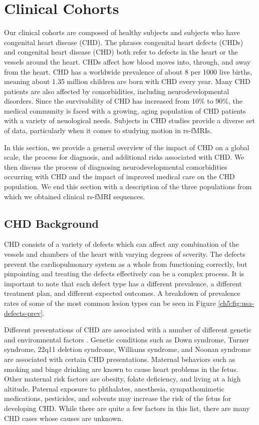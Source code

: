 \section{Clinical Cohorts}

Our clinical cohorts are composed of healthy subjects and subjects who have congenital heart disease (CHD).
The phrases congenital heart defects (CHDs) and congenital heart disease (CHD) both refer to defects in the heart or the vessels around the heart. CHDs affect how blood moves into, through, and away from the heart. 
CHD has a worldwide prevalence of about 8 per 1000 live births, meaning about 1.35 million children are born with CHD every year. Many CHD patients are also affected by comorbidities, including neurodevelopmental disorders. Since the survivability of CHD has increased from 10\% to 90\%, the medical community is faced with a growing, aging population of CHD patients with a variety of neuological needs. Subjects in CHD studies provide a diverse set of data, particularly when it comes to studying motion in rs-fMRIs.

In this section, we provide a general overview of the impact of CHD on a global scale, the process for diagnosis, and additional risks associated with CHD. We then discuss the process of diagnosing neurodevelopmental comorbidities occurring with CHD and the impact of improved medical care on the CHD population. We end this section with a description of the three populations from which we obtained clinical rs-fMRI sequences.


\subsection{CHD Background}

CHD consists of a variety of defects which can affect any combination of the vessels and chambers of the heart with varying degrees of severity. The defects prevent the cardiopulmonary system as a whole from functioning correctly, but pinpointing and treating the defects effectively can be a complex process. It is important to note that each defect type has a different prevalence, a different treatment plan, and different expected outcomes. A breakdown of prevalence rates of some of the most common lesion types can be seen in Figure \ref{ch5:fig:usa-defects-prev}. %

Different presentations of CHD are associated with a number of different genetic and environmental factors \cite{Mozaffarian2016}. Genetic conditions such as Down syndrome, Turner syndrome, 22q11 deletion syndrome, Williams syndrome, and Noonan syndrome are associated with certain CHD presentations. Maternal behaviors such as smoking and binge drinking are known to cause heart problems in the fetus. Other maternal risk factors are obesity, folate deficiency, and living at a high altitude. Paternal exposure to phthalates, anesthesia, sympathomimetic medications, pesticides, and solvents may increase the risk of the fetus for developing CHD. While there are quite a few factors in this list, there are many CHD cases whose causes are unknown.

